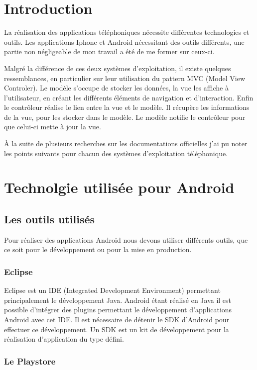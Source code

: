 \section{Introduction}

La réalisation des applications téléphoniques nécessite différentes technologies et outils. Les applications Iphone et Android nécessitant des outils différents, une partie non négligeable de mon travail a été de me former sur ceux-ci.

Malgré la différence de ces deux systèmes d'exploitation, il existe quelques ressemblances, en particulier sur leur utilisation du pattern MVC (Model View Controler). Le modèle s’occupe de stocker les données, la vue les affiche à l’utilisateur, en créant les différents éléments de navigation et d'interaction. Enfin le contrôleur réalise le lien entre la vue et le modèle. Il récupère les informations de la vue, pour les stocker dans le modèle. Le modèle notifie le contrôleur pour que celui-ci mette à jour la vue.

À la suite de plusieurs recherches sur les documentations officielles j'ai pu noter les points suivants pour chacun des systèmes d'exploitation téléphonique.

\section{Technolgie utilisée pour Android}

\subsection{Les outils utilisés}

Pour réaliser des applications Android nous devons utiliser différents outils, que ce soit pour le développement ou pour la mise en production.

\subsubsection{Eclipse}

Eclipse est un IDE (Integrated Development Environment) permettant principalement le développement Java. Android étant réalisé en Java il est possible d'intégrer des plugins permettant le développement d'applications Android avec cet IDE. Il est nécessaire de détenir le SDK d'Android pour effectuer ce développement. Un SDK est un kit de développement pour la réalisation d'application du type défini.

\subsubsection{Le Playstore}

